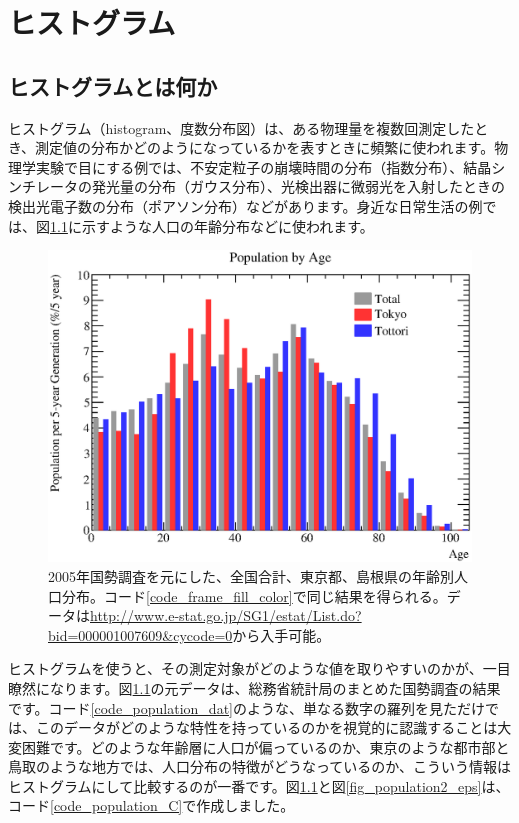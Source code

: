 \chapter{ヒストグラム}
\label{chap_Histogram}

\section{ヒストグラムとは何か}

ヒストグラム（histogram、度数分布図）は、ある物理量を複数回測定したとき、測定値の分布かどのようになっているかを表すときに頻繁に使われます。物理学実験で目にする例では、不安定粒子の崩壊時間の分布（指数分布）、結晶シンチレータの発光量の分布（ガウス分布）、光検出器に微弱光を入射したときの検出光電子数の分布（ポアソン分布）などがあります。身近な日常生活の例では、図\ref{fig_population_eps}に示すような人口の年齢分布などに使われます。

\begin{figure}
  \centering
  \includegraphics[width=12cm,clip]{fig/population.eps}
  \caption{2005年国勢調査を元にした、全国合計、東京都、島根県の年齢別人口分布。コード\ref{code_frame_fill_color}で同じ結果を得られる。データは\url{http://www.e-stat.go.jp/SG1/estat/List.do?bid=000001007609&cycode=0}から入手可能。}
  \label{fig_population_eps}
\end{figure}

ヒストグラムを使うと、その測定対象がどのような値を取りやすいのかが、一目瞭然になります。図\ref{fig_population_eps}の元データは、総務省統計局のまとめた国勢調査の結果です。コード\ref{code_population_dat}のような、単なる数字の羅列を見ただけでは、このデータがどのような特性を持っているのかを視覚的に認識することは大変困難です。どのような年齢層に人口が偏っているのか、東京のような都市部と鳥取のような地方では、人口分布の特徴がどうなっているのか、こういう情報はヒストグラムにして比較するのが一番です。図\ref{fig_population_eps}と図\ref{fig_population2_eps}は、コード\ref{code_population_C}で作成しました。

